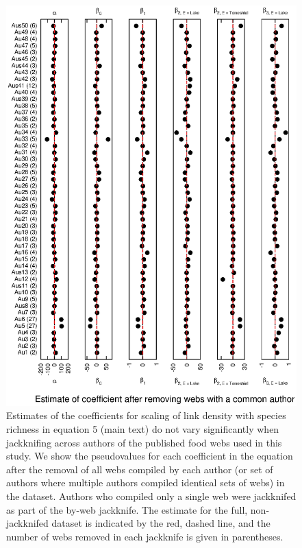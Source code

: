 \documentclass[12pt]{article}
\begin{document}
    \begin{figure}[!h]
    \centerline{\includegraphics*[height=.75\textheight]{Figures/Jackknife/LS_author.eps}}
    \caption{Estimates of the coefficients for scaling of link density with species richness
    in equation 5 (main text) do not vary significantly
    when jackknifing across authors of the published food webs used in this study. 
    We show the pseudovalues for each coefficient
    in the equation after the removal of all webs compiled by each author (or set of authors where
    multiple authors compiled identical sets of webs) in the dataset. Authors
    who compiled only a single web were jackknifed as part of the by-web jackknife.
    The estimate for the full, non-jackknifed dataset is indicated by the red, dashed line, and
    the number of webs removed in each jackknife is given in parentheses.}
    \label{LS_auth}
    \end{figure}
\end{document}
